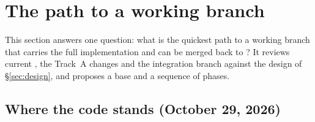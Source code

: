 \documentclass[11pt]{article}
\newcommand{\code}{\path}
\begin{document}
\section{The path to a working branch}\label{sec:plan}

This section answers one question: what is the quickest path to a working branch that carries the full implementation and can be merged back to \code{dev}? It reviews current \code{dev}, the Track~A changes and the integration branch against the design of \S\ref{sec:design}, and proposes a base and a sequence of phases.

\subsection{Where the code stands (October 29, 2026)}
\end{document}
